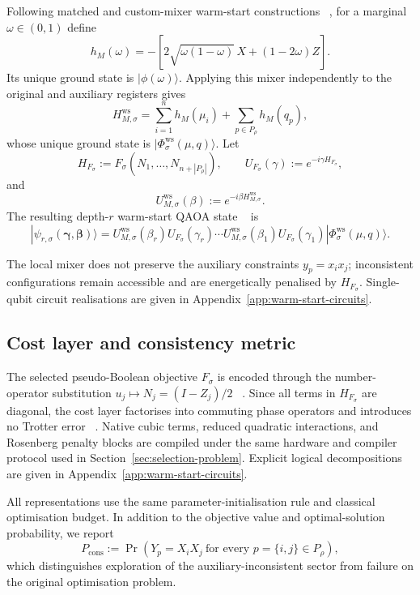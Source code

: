 \documentclass[a4paper,onecolumn,11pt,unpublished]{quantumarticle}
\theoremstyle{remark}
\begin{document}
Following matched and custom-mixer warm-start constructions
~\cite{Egger2021,TateCustom2023}, for a marginal $\omega\in(0,1)$ define
\[
h_M(\omega)
=
-\left[
2\sqrt{\omega(1-\omega)}\,X
+
(1-2\omega)Z
\right].
\]
Its unique ground state is $|\phi(\omega)\rangle$.  Applying this mixer
independently to the original and auxiliary registers gives
\begin{equation}
H_{M,\sigma}^{\mathrm{ws}}
=
\sum_{i=1}^n h_M(\mu_i)
+
\sum_{p\in P_\rho}h_M(q_p),
\label{eq:ws-mixer}
\end{equation}
whose unique ground state is
$|\Phi_\sigma^{\mathrm{ws}}(\mu,q)\rangle$.
Let
\[
H_{F_\sigma}:=F_\sigma(N_1,\ldots,N_{n+|P_\rho|}),
\qquad
U_{F_\sigma}(\gamma):=e^{-i\gamma H_{F_\sigma}},
\]
and
\[
U_{M,\sigma}^{\mathrm{ws}}(\beta)
:=
e^{-i\beta H_{M,\sigma}^{\mathrm{ws}}}.
\]
The resulting depth-$r$ warm-start QAOA state
~\cite{Farhi2014,Egger2021,TateCustom2023} is
\begin{equation}
|\psi_{r,\sigma}(\boldsymbol\gamma,\boldsymbol\beta)\rangle
=
U^{\mathrm{ws}}_{M,\sigma}(\beta_r)
U_{F_\sigma}(\gamma_r)
\cdots
U^{\mathrm{ws}}_{M,\sigma}(\beta_1)
U_{F_\sigma}(\gamma_1)
|\Phi^{\mathrm{ws}}_\sigma(\mu,q)\rangle .
\end{equation}

The local mixer does not preserve the auxiliary constraints
$y_p=x_ix_j$; inconsistent configurations remain accessible and are
energetically penalised by $H_{F_\sigma}$.
Single-qubit circuit realisations are given in
Appendix~\ref{app:warm-start-circuits}.



\subsection{Cost layer and consistency metric}
\label{sec:cost-consistency}
The selected pseudo-Boolean objective $F_\sigma$ is encoded through the
number-operator substitution $u_j\mapsto N_j=(I-Z_j)/2$
~\cite{Hadfield2021}.  Since all terms in
$H_{F_\sigma}$ are diagonal, the cost layer factorises into commuting phase
operators and introduces no Trotter error
~\cite{CampbellDahl2022,Verchere2023}.  Native cubic terms, reduced
quadratic interactions, and Rosenberg penalty blocks are compiled under the
same hardware and compiler protocol used in Section~\ref{sec:selection-problem}.
Explicit logical decompositions are given in
Appendix~\ref{app:warm-start-circuits}.

All representations use the same parameter-initialisation rule and classical
optimisation budget.  In addition to the objective value and optimal-solution
probability, we report
\begin{equation}
P_{\mathrm{cons}}
:=
\Pr\!\left(
Y_p=X_iX_j\ \text{for every }p=\{i,j\}\in P_\rho
\right),
\label{eq:pcons}
\end{equation}
which distinguishes exploration of the auxiliary-inconsistent sector from
failure on the original optimisation problem.
\end{document}
